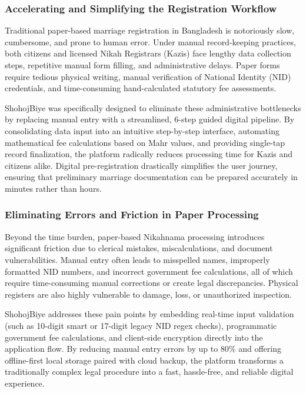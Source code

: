 \documentclass[12pt,a4paper]{article}
\begin{document}
	\subsubsection{Accelerating and Simplifying the Registration Workflow}
	Traditional paper-based marriage registration in Bangladesh is notoriously slow, cumbersome, and prone to human error. Under manual record-keeping practices, both citizens and licensed Nikah Registrars (Kazis) face lengthy data collection steps, repetitive manual form filling, and administrative delays. Paper forms require tedious physical writing, manual verification of National Identity (NID) credentials, and time-consuming hand-calculated statutory fee assessments.
	
	ShohojBiye was specifically designed to eliminate these administrative bottlenecks by replacing manual entry with a streamlined, 6-step guided digital pipeline. By consolidating data input into an intuitive step-by-step interface, automating mathematical fee calculations based on Mahr values, and providing single-tap record finalization, the platform radically reduces processing time for Kazis and citizens alike. Digital pre-registration drastically simplifies the user journey, ensuring that preliminary marriage documentation can be prepared accurately in minutes rather than hours.
	
	\subsubsection{Eliminating Errors and Friction in Paper Processing}
	Beyond the time burden, paper-based Nikahnama processing introduces significant friction due to clerical mistakes, miscalculations, and document vulnerabilities. Manual entry often leads to misspelled names, improperly formatted NID numbers, and incorrect government fee calculations, all of which require time-consuming manual corrections or create legal discrepancies. Physical registers are also highly vulnerable to damage, loss, or unauthorized inspection.
	
	ShohojBiye addresses these pain points by embedding real-time input validation (such as 10-digit smart or 17-digit legacy NID regex checks), programmatic government fee calculations, and client-side encryption directly into the application flow. By reducing manual entry errors by up to 80\% and offering offline-first local storage paired with cloud backup, the platform transforms a traditionally complex legal procedure into a fast, hassle-free, and reliable digital experience.
	
\end{document}
